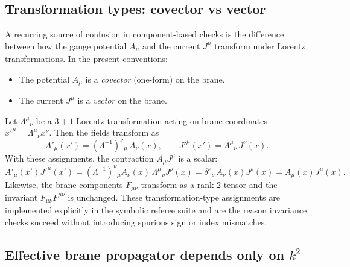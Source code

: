 \documentclass[11pt]{article}
\newcommand{\A}{A}
\newcommand{\F}{F}
\newcommand{\J}{J}
\begin{document}
\subsection{Transformation types: covector vs vector}
\label{sec:covector_vector}

A recurring source of confusion in component-based checks is the difference
between how the gauge potential \(\A_\mu\) and the current \(\J^\mu\) transform
under Lorentz transformations. In the present conventions:

\begin{itemize}
\item The potential \(\A_\mu\) is a \emph{covector} (one-form) on the brane.
\item The current \(\J^\mu\) is a \emph{vector} on the brane.
\end{itemize}

Let \(\Lambda^\mu{}_\nu\) be a \(3+1\) Lorentz transformation acting on brane
coordinates \(x'^\mu=\Lambda^\mu{}_\nu x^\nu\). Then the fields transform as
\begin{equation}
  \A'_\mu(x') = (\Lambda^{-1})^\nu{}_\mu \,\A_\nu(x),
  \qquad
  \J'^\mu(x') = \Lambda^\mu{}_\nu\,\J^\nu(x).
  \label{eq:lorentz_transform_types}
\end{equation}
With these assignments, the contraction \(\A_\mu \J^\mu\) is a scalar:
\begin{equation}
  \A'_\mu(x')\J'^\mu(x')
  =
  (\Lambda^{-1})^\nu{}_\mu \A_\nu(x)\,
  \Lambda^\mu{}_\rho \J^\rho(x)
  =
  \delta^\nu{}_\rho\,\A_\nu(x)\J^\rho(x)
  =
  \A_\mu(x)\J^\mu(x).
\end{equation}
Likewise, the brane components \(\F_{\mu\nu}\) transform as a rank-2 tensor and
the invariant \(\F_{\mu\nu}\F^{\mu\nu}\) is unchanged. These transformation-type
assignments are implemented explicitly in the symbolic referee suite and are the
reason invariance checks succeed without introducing spurious sign or index
mismatches.

\subsection{Effective brane propagator depends only on \(k^2\)}
\label{sec:prop_k2}
\end{document}

